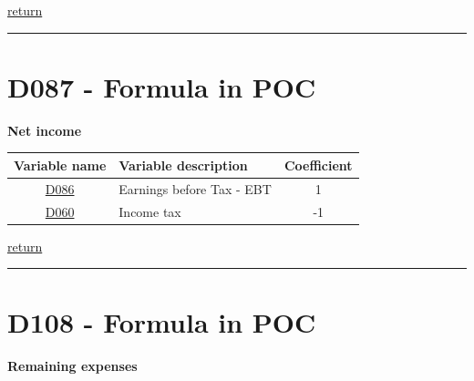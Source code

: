 \documentclass[]{book}
\begin{document}
\protect\hyperlink{b3.-profit-and-loss-statement-variables}{return}

\begin{center}\rule{0.5\linewidth}{\linethickness}\end{center}

\hypertarget{d087---formula-in-poc}{%
\section{D087 - Formula in POC}\label{d087---formula-in-poc}}

\textbf{Net income}

\begin{longtable}[]{@{}clc@{}}
\toprule
Variable name & Variable description & Coefficient\tabularnewline
\midrule
\endhead
\protect\hyperlink{d086---formula-in-poc}{D086} & Earnings before Tax - EBT & 1\tabularnewline
\protect\hyperlink{d060---formula-in-poc}{D060} & Income tax & -1\tabularnewline
\bottomrule
\end{longtable}

\protect\hyperlink{b3.-profit-and-loss-statement-variables}{return}

\begin{center}\rule{0.5\linewidth}{\linethickness}\end{center}

\hypertarget{d108---formula-in-poc}{%
\section{D108 - Formula in POC}\label{d108---formula-in-poc}}

\textbf{Remaining expenses}
\end{document}

